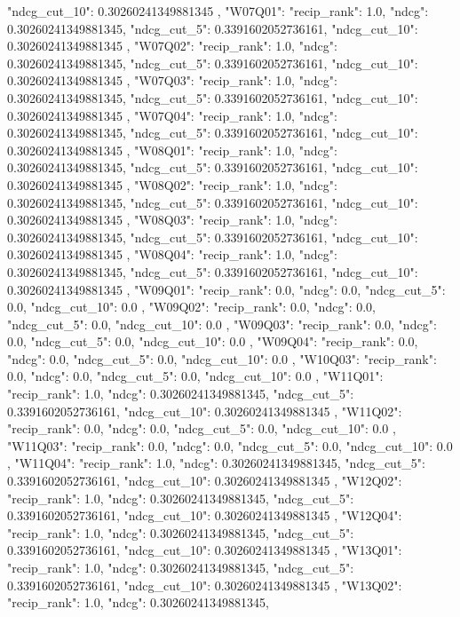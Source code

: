 {{  "ndcg_cut_10": 0.30260241349881345
 },
 "W07Q01": {
  "recip_rank": 1.0,
  "ndcg": 0.30260241349881345,
  "ndcg_cut_5": 0.3391602052736161,
  "ndcg_cut_10": 0.30260241349881345
 },
 "W07Q02": {
  "recip_rank": 1.0,
  "ndcg": 0.30260241349881345,
  "ndcg_cut_5": 0.3391602052736161,
  "ndcg_cut_10": 0.30260241349881345
 },
 "W07Q03": {
  "recip_rank": 1.0,
  "ndcg": 0.30260241349881345,
  "ndcg_cut_5": 0.3391602052736161,
  "ndcg_cut_10": 0.30260241349881345
 },
 "W07Q04": {
  "recip_rank": 1.0,
  "ndcg": 0.30260241349881345,
  "ndcg_cut_5": 0.3391602052736161,
  "ndcg_cut_10": 0.30260241349881345
 },
 "W08Q01": {
  "recip_rank": 1.0,
  "ndcg": 0.30260241349881345,
  "ndcg_cut_5": 0.3391602052736161,
  "ndcg_cut_10": 0.30260241349881345
 },
 "W08Q02": {
  "recip_rank": 1.0,
  "ndcg": 0.30260241349881345,
  "ndcg_cut_5": 0.3391602052736161,
  "ndcg_cut_10": 0.30260241349881345
 },
 "W08Q03": {
  "recip_rank": 1.0,
  "ndcg": 0.30260241349881345,
  "ndcg_cut_5": 0.3391602052736161,
  "ndcg_cut_10": 0.30260241349881345
 },
 "W08Q04": {
  "recip_rank": 1.0,
  "ndcg": 0.30260241349881345,
  "ndcg_cut_5": 0.3391602052736161,
  "ndcg_cut_10": 0.30260241349881345
 },
 "W09Q01": {
  "recip_rank": 0.0,
  "ndcg": 0.0,
  "ndcg_cut_5": 0.0,
  "ndcg_cut_10": 0.0
 },
 "W09Q02": {
  "recip_rank": 0.0,
  "ndcg": 0.0,
  "ndcg_cut_5": 0.0,
  "ndcg_cut_10": 0.0
 },
 "W09Q03": {
  "recip_rank": 0.0,
  "ndcg": 0.0,
  "ndcg_cut_5": 0.0,
  "ndcg_cut_10": 0.0
 },
 "W09Q04": {
  "recip_rank": 0.0,
  "ndcg": 0.0,
  "ndcg_cut_5": 0.0,
  "ndcg_cut_10": 0.0
 },
 "W10Q03": {
  "recip_rank": 0.0,
  "ndcg": 0.0,
  "ndcg_cut_5": 0.0,
  "ndcg_cut_10": 0.0
 },
 "W11Q01": {
  "recip_rank": 1.0,
  "ndcg": 0.30260241349881345,
  "ndcg_cut_5": 0.3391602052736161,
  "ndcg_cut_10": 0.30260241349881345
 },
 "W11Q02": {
  "recip_rank": 0.0,
  "ndcg": 0.0,
  "ndcg_cut_5": 0.0,
  "ndcg_cut_10": 0.0
 },
 "W11Q03": {
  "recip_rank": 0.0,
  "ndcg": 0.0,
  "ndcg_cut_5": 0.0,
  "ndcg_cut_10": 0.0
 },
 "W11Q04": {
  "recip_rank": 1.0,
  "ndcg": 0.30260241349881345,
  "ndcg_cut_5": 0.3391602052736161,
  "ndcg_cut_10": 0.30260241349881345
 },
 "W12Q02": {
  "recip_rank": 1.0,
  "ndcg": 0.30260241349881345,
  "ndcg_cut_5": 0.3391602052736161,
  "ndcg_cut_10": 0.30260241349881345
 },
 "W12Q04": {
  "recip_rank": 1.0,
  "ndcg": 0.30260241349881345,
  "ndcg_cut_5": 0.3391602052736161,
  "ndcg_cut_10": 0.30260241349881345
 },
 "W13Q01": {
  "recip_rank": 1.0,
  "ndcg": 0.30260241349881345,
  "ndcg_cut_5": 0.3391602052736161,
  "ndcg_cut_10": 0.30260241349881345
 },
 "W13Q02": {
  "recip_rank": 1.0,
  "ndcg": 0.30260241349881345,
}}
